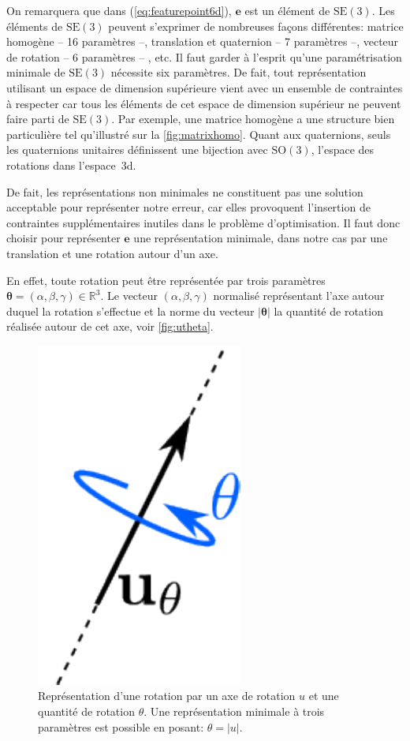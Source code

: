 On remarquera que dans (\autoref{eq:featurepoint6d}), $\mathbf{e}$ est
un élément de $\text{SE}(3)$. Les éléments de $\text{SE}(3)$ peuvent
s'exprimer de nombreuses façons différentes: matrice homogène -- 16
paramètres --, translation et quaternion -- 7 paramètres
--, vecteur de rotation -- 6 paramètres --
, etc. Il faut garder à l'esprit qu'une
paramétrisation minimale de $\text{SE}(3)$ nécessite six
paramètres. De fait, tout représentation utilisant un espace de
dimension supérieure vient avec un ensemble de contraintes à respecter
car tous les éléments de cet espace de dimension supérieur ne peuvent
faire parti de $\text{SE}(3)$. Par exemple, une matrice homogène a une
structure bien particulière tel qu'illustré sur la
\autoref{fig:matrixhomo}. Quant aux quaternions, seuls les quaternions
unitaires définissent une bijection avec $\text{SO}(3)$, l'espace des
rotations dans l'espace 3d.

De fait, les représentations non minimales ne constituent pas une
solution acceptable pour représenter notre erreur, car elles
provoquent l'insertion de contraintes supplémentaires inutiles dans le
problème d'optimisation. Il faut donc choisir pour représenter
$\mathbf{e}$ une représentation minimale, dans notre cas par une
translation et une rotation autour d'un axe.

En effet, toute rotation peut être représentée par trois paramètres
\mbox{$\mathbf{\theta} = (\alpha, \beta, \gamma) \in \mathbb{R}^3$}. Le
vecteur $(\alpha, \beta, \gamma)$ normalisé représentant l'axe autour
duquel la rotation s'effectue et la norme du vecteur
$|\mathbf{\theta}|$ la quantité de rotation réalisée autour de cet
axe, voir \autoref{fig:utheta}.

\begin{figure}
  \begin{center}
    \includegraphics[width=.1\linewidth]{src/chap3-primitive-mouvement/utheta.pdf}
  \end{center}
  \caption{Représentation d'une rotation par un axe de rotation $u$ et
    une quantité de rotation $\theta$. Une représentation minimale à
    trois paramètres est possible en posant: $\theta = |u|$. \label{fig:utheta}}
\end{figure}


